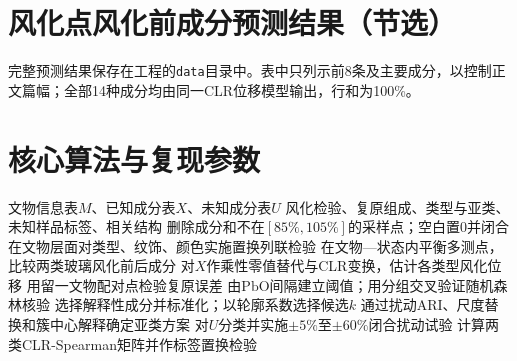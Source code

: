 \documentclass[UTF8,a4paper,zihao=-4,fontset=windows]{ctexart}
\begin{document}
\clearpage
\appendix
{}

\section{风化点风化前成分预测结果（节选）}

\begin{table}[H]
\centering
\caption{CLR位移模型预测的风化前成分（单位：\%）}
\label{tab:appendix_prediction}
\end{table}

完整预测结果保存在工程的\texttt{data}目录中。表中只列示前8条及主要成分，以控制正文篇幅；全部14种成分均由同一CLR位移模型输出，行和为100\%。

\section{核心算法与复现参数}

\begin{algorithm}[H]
\caption{分层稳健的古代玻璃分析流程}
\label{alg:pipeline}
\begin{algorithmic}[1]
\Require 文物信息表$M$、已知成分表$X$、未知成分表$U$
\Ensure 风化检验、复原组成、类型与亚类、未知样品标签、相关结构
\State 删除成分和不在$[85\%,105\%]$的采样点；空白置0并闭合
\State 在文物层面对类型、纹饰、颜色实施置换列联检验
\State 在文物—状态内平衡多测点，比较两类玻璃风化前后成分
\State 对$X$作乘性零值替代与CLR变换，估计各类型风化位移
\State 用留一文物配对点检验复原误差
\State 由$\mathrm{PbO}$间隔建立阈值；用分组交叉验证随机森林核验
\State 选择解释性成分并标准化；以轮廓系数选择候选$k$
\State 通过扰动ARI、尺度替换和簇中心解释确定亚类方案
\State 对$U$分类并实施$\pm5\%$至$\pm60\%$闭合扰动试验
\State 计算两类CLR-Spearman矩阵并作标签置换检验
\end{algorithmic}
\end{algorithm}
\end{document}

